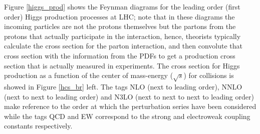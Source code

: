 Figure \ref{higgs_prod} shows the Feynman diagrams for the leading order (first order) Higgs production processes at LHC; note that in these diagrams the incoming particles are not the protons themselves but the partons from the protons that actually participate in the interaction, hence, theorists typically calculate the cross section for the parton interaction, and then convolute that cross section with the information from the PDFs to get a production cross section that is actually measured in experiments. The cross section for Higgs production as a function of the center of mass-energy ($\sqrt{s}$) for \pp collisions is showed in Figure \ref{hcs_br} left. The tags NLO (next to leading order), NNLO (next to next to leading order) and N3LO (next to next to next to leading order) make reference to the order at which the perturbation series have been considered while the tags QCD and EW correspond to the strong and electroweak coupling constants respectively.

